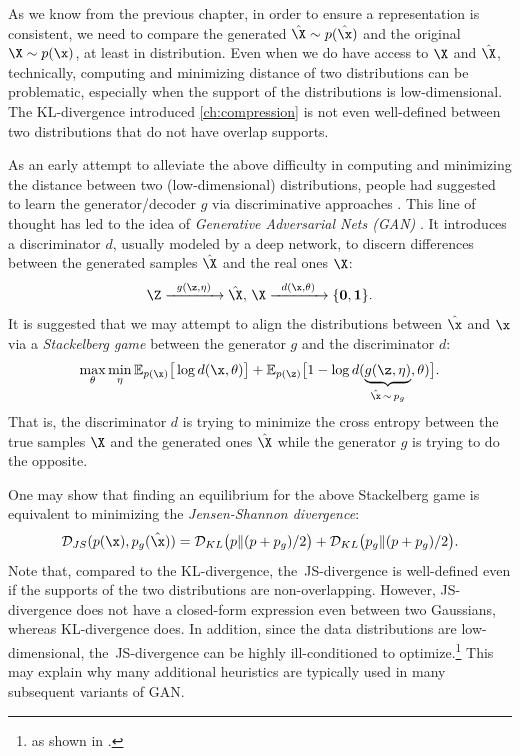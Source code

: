 \documentclass[../../book-main.tex]{subfiles}
\begin{document}
As we know from the previous chapter, in order to ensure a representation is consistent, we need to compare the generated $\hat \X \sim p(\hat\x)$ and the original $\X \sim p(\x)$, at least in distribution. Even when we do have access to $\X$ and $\hat \X$, technically, computing and minimizing distance of two distributions can be problematic, especially when the support of the distributions is low-dimensional. The KL-divergence introduced \ref{ch:compression} is not even well-defined between two distributions that do not have overlap supports. 

As an early attempt to alleviate the above difficulty in computing and minimizing the distance between two (low-dimensional)  distributions, people had suggested to learn the generator/decoder $g$ via discriminative approaches \cite{Tu-2007}. This line of thought has led to  the idea of {\em Generative Adversarial Nets (GAN)} \cite{goodfellow2014generative}. It introduces a discriminator $d$, usually modeled by a deep network, to discern differences between the generated samples $\hat \X$ and the real ones $\X$:
\begin{equation}
 \Z \xrightarrow{\hspace{2mm} g(\z,\eta) \hspace{2mm}} \hat \X, \, \X \xrightarrow{\hspace{2mm} d(\x, \theta)\hspace{2mm}} \{\mathbf 0, \mathbf 1\}.
 \label{eqn:GAN}
\end{equation}
It is suggested that we may attempt to align the distributions between $\hat \x$ and $\x$ via a {\em Stackelberg game} between the generator $g$ and the discriminator $d$:
\begin{equation}
\max_{\theta}\min_{\eta} \mathbb{E}_{p({\x})}\big[\log d(\x,\theta)\big] + \mathbb{E}_{p({\z})}\big[1 - \log d(\underbrace{g(\z,\eta)}_{\hat \x \,\sim\, p_g},\theta)\big].
\end{equation}
That is, the discriminator $d$ is trying to minimize the cross entropy between the true samples $\X$ and the generated ones $\hat \X$ while the generator $g$ is trying to do  the opposite. 

One may show that finding an equilibrium for the above Stackelberg game is equivalent to minimizing the {\em Jensen-Shannon divergence}:
\begin{equation}
    \mathcal{D}_{JS}(p(\x), p_g(\hat \x)) = \mathcal{D}_{KL}\big(p \| (p + p_g)/{2}\big) + \mathcal{D}_{KL}\big(p_g \| (p + p_g)/{2}\big).
\end{equation}
Note that, compared to the KL-divergence, the~JS-divergence is well-defined even if the supports of the two distributions are non-overlapping. However, JS-divergence does not have a closed-form expression even between two Gaussians, whereas KL-divergence does. In addition, since the data distributions are low-dimensional, the~JS-divergence can be highly ill-conditioned to optimize.\footnote{as shown in \cite{arjovsky2017wasserstein}.} This may explain why many additional heuristics are typically used in many subsequent variants of GAN. 
\end{document}
